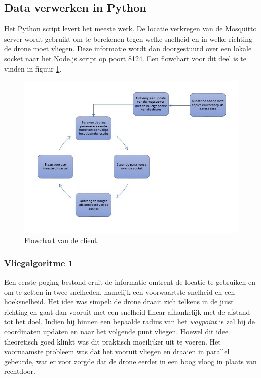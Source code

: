 \subsection{Data verwerken in Python}
Het Python script levert het meeste werk.
De locatie verkregen van de Mosquitto server wordt gebruikt om te berekenen tegen welke snelheid en in welke richting de drone moet vliegen.
Deze informatie wordt dan doorgestuurd over een lokale socket naar het Node.js script op poort 8124.
Een flowchart voor dit deel is te vinden in figuur \ref{fig:flowchart_client}.
\begin{figure}[p]
	\centering
	\includegraphics[width=\textwidth]{images/python_client_flowchart}
	\caption[Flowchart van de client]{Flowchart van de client.}
	\label{fig:flowchart_client}
\end{figure}

\subsubsection{Vliegalgoritme 1}
Een eerste poging bestond eruit de informatie omtrent de locatie te gebruiken en om te zetten in twee snelheden, namelijk een voorwaartste snelheid en een hoeksnelheid.
Het idee was simpel: de drone draait zich telkens in de juist richting en gaat dan vooruit met een snelheid linear afhankelijk met de afstand tot het doel.
Indien hij binnen een bepaalde radius van het \textit{waypoint} is zal hij de coordinaten updaten en naar het volgende punt vliegen.
Hoewel dit idee theoretisch goed klinkt was dit praktisch moeilijker uit te voeren.
Het voornaamste probleem was dat het vooruit vliegen en draaien in parallel gebeurde, wat er voor zorgde dat de drone eerder in een boog vloog in plaats van rechtdoor.

